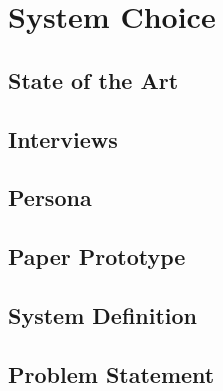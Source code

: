 \chapter{System Choice}


\section{State of the Art}
\label{StateOfTheArt}


\section{Interviews}





\section{Persona}


\section{Paper Prototype}


\section{System Definition}


\section{Problem Statement}
\label{ProblemStatement}

